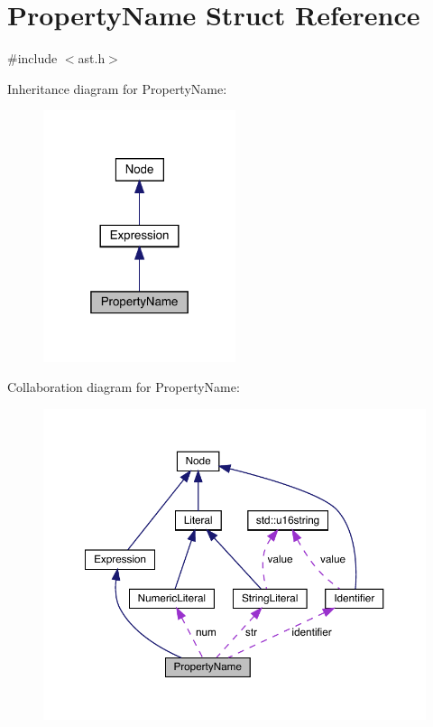 \hypertarget{struct_property_name}{}\section{Property\+Name Struct Reference}
\label{struct_property_name}


{\ttfamily \#include $<$ast.\+h$>$}



Inheritance diagram for Property\+Name\+:\nopagebreak
\begin{figure}[H]
\begin{center}
\leavevmode
\includegraphics[width=160pt]{struct_property_name__inherit__graph}
\end{center}
\end{figure}


Collaboration diagram for Property\+Name\+:\nopagebreak
\begin{figure}[H]
\begin{center}
\leavevmode
\includegraphics[width=350pt]{struct_property_name__coll__graph}
\end{center}
\end{figure}
